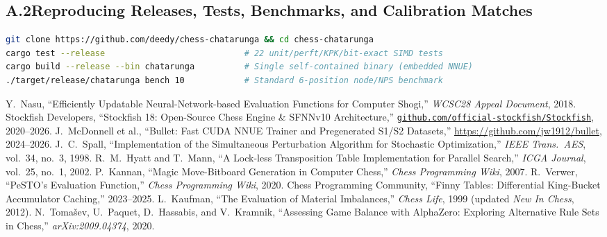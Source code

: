 \documentclass[10.5pt,letterpaper]{article}
\begin{document}
\subsection*{A.2\quad Reproducing Releases, Tests, Benchmarks, and Calibration Matches}
\begin{lstlisting}[language=bash]
git clone https://github.com/deedy/chess-chatarunga && cd chess-chatarunga
cargo test --release                            # 22 unit/perft/KPK/bit-exact SIMD tests
cargo build --release --bin chatarunga          # Single self-contained binary (embedded NNUE)
./target/release/chatarunga bench 10            # Standard 6-position node/NPS benchmark
\end{lstlisting}

\vspace{6pt}
{\small\raggedright
\begin{thebibliography}{99}
\setlength{\itemsep}{2pt}
 Y.~Nasu, ``Efficiently Updatable Neural-Network-based Evaluation Functions for Computer Shogi,'' \emph{WCSC28 Appeal Document}, 2018.
 Stockfish Developers, ``Stockfish 18: Open-Source Chess Engine \& SFNNv10 Architecture,'' \href{https://github.com/official-stockfish/Stockfish}{\texttt{github.com/official-stockfish/Stockfish}}, 2020--2026.
 J.~McDonnell et al., ``Bullet: Fast CUDA NNUE Trainer and Pregenerated S1/S2 Datasets,'' \url{https://github.com/jw1912/bullet}, 2024--2026.
 J.~C.~Spall, ``Implementation of the Simultaneous Perturbation Algorithm for Stochastic Optimization,'' \emph{IEEE Trans.\ AES}, vol.~34, no.~3, 1998.
 R.~M.~Hyatt and T.~Mann, ``A Lock-less Transposition Table Implementation for Parallel Search,'' \emph{ICGA Journal}, vol.~25, no.~1, 2002.
 P.~Kannan, ``Magic Move-Bitboard Generation in Computer Chess,'' \emph{Chess Programming Wiki}, 2007.
 R.~Verwer, ``PeSTO's Evaluation Function,'' \emph{Chess Programming Wiki}, 2020.
 Chess Programming Community, ``Finny Tables: Differential King-Bucket Accumulator Caching,'' 2023--2025.
 L.~Kaufman, ``The Evaluation of Material Imbalances,'' \emph{Chess Life}, 1999 (updated \emph{New In Chess}, 2012).
 N.~Toma\v{s}ev, U.~Paquet, D.~Hassabis, and V.~Kramnik, ``Assessing Game Balance with AlphaZero: Exploring Alternative Rule Sets in Chess,'' \emph{arXiv:2009.04374}, 2020.
\end{thebibliography}
}
\end{document}
